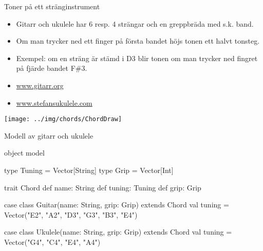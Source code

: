 \begin{Slide}{Toner på ett stränginstrument}
\begin{minipage}{0.5\textwidth}
\begin{itemize}\SlideFontSmall
\item Gitarr och ukulele har 6 resp. 4 strängar och en greppbräda med s.k. band.

\item Om man trycker ned ett finger på första bandet höjs tonen ett halvt tonsteg. 

\item Exempel: om en sträng är stämd i D3 blir tonen om man trycker ned fingret på fjärde bandet F\#3.

\item \href{http://www.gitarr.org}{www.gitarr.org}

\item \href{http://www.stefansukulele.com}{www.stefansukulele.com}

\end{itemize}
\end{minipage}
\begin{minipage}{0.45\textwidth}
\texttt{[image: ../img/chords/ChordDraw]}
\end{minipage}

\end{Slide}

\begin{Slide}{Modell av gitarr och ukulele}
\begin{Code}
object model {
  type Tuning = Vector[String]
  type Grip = Vector[Int]

  trait Chord {
    def name: String
    def tuning: Tuning
    def grip: Grip
  }
  
  case class Guitar(name: String, grip: Grip) extends Chord {
    val tuning = Vector("E2", "A2", "D3", "G3", "B3", "E4")
  }
  
  case class Ukulele(name: String, grip: Grip) extends Chord {
    val tuning = Vector("G4", "C4", "E4", "A4")
  }

}
\end{Code}
\end{Slide}

